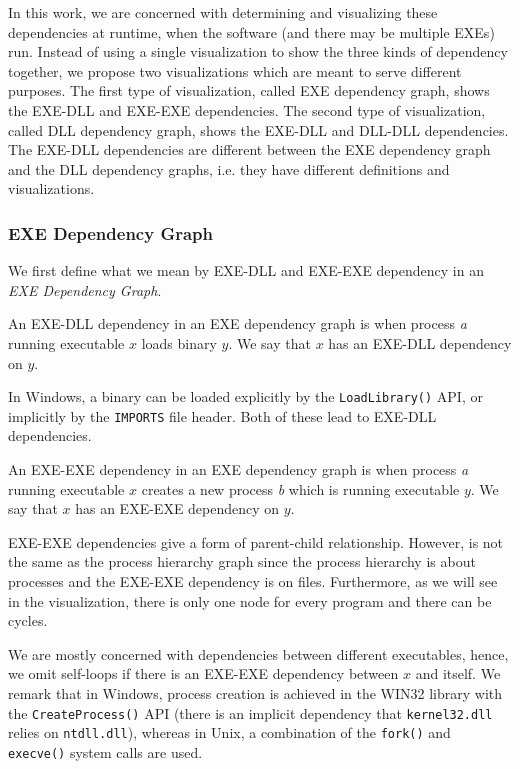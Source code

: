 In this work, we are concerned with determining and visualizing these
dependencies at runtime, when the software (and there may be multiple
EXEs) run.
Instead of using a single visualization to show the three kinds of dependency
together, we propose two visualizations which are meant
to serve different purposes.
The first type of visualization, called EXE dependency graph,
shows the EXE-DLL and EXE-EXE dependencies.
The second type of visualization, called DLL dependency graph,
shows the EXE-DLL and DLL-DLL dependencies.
The EXE-DLL dependencies are different between the EXE dependency
graph and the DLL dependency graphs, i.e. they have different definitions
and visualizations.

\subsubsection{EXE Dependency Graph}
\label{sec:exe-dep-graph}

We first define what we mean by EXE-DLL and EXE-EXE dependency in
an {\em EXE Dependency Graph}.

\begin{definition}
An EXE-DLL dependency in an EXE dependency graph
is when process {\em a} running executable
$x$ loads binary $y$.
We say that $x$ has an EXE-DLL dependency on $y$.
\end{definition}
In Windows, a binary can be loaded explicitly by the {\tt LoadLibrary()} API,
or implicitly by the {\tt IMPORTS} file header.
Both of these lead to EXE-DLL dependencies.

\begin{definition}
An EXE-EXE dependency in an EXE dependency graph
is when process {\em a} running executable $x$ creates
a new process {\em b} which is running executable $y$.
We say that $x$ has an EXE-EXE dependency on $y$.
\end{definition}

EXE-EXE dependencies give a form of parent-child relationship.
However, is not the same as the process hierarchy graph
since the process hierarchy is about processes and the EXE-EXE
dependency is on files.
Furthermore, as we will see in the visualization,
there is only one node for every program and there can be cycles.

We are mostly concerned with dependencies between different executables,
hence, we omit self-loops if there is an EXE-EXE dependency between $x$ and
itself.
We remark that in Windows, process creation is achieved in the WIN32 library
with the {\tt CreateProcess()} API (there
is an implicit dependency that {\tt kernel32.dll} relies on {\tt ntdll.dll}),
whereas in Unix, a combination of the
{\tt fork()} and {\tt execve()} system calls
are used.

